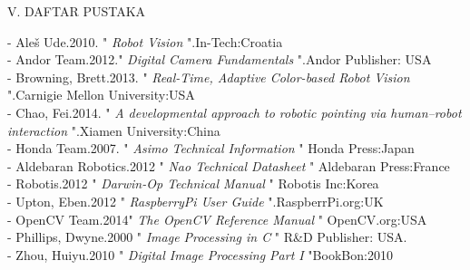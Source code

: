 \documentclass[10pt,journal,compsoc]{IEEEtran}
\begin{document}
  \begin{center}
     V. DAFTAR PUSTAKA
  \end{center}
  
  \noindent - Aleš Ude.2010. " \textit{Robot Vision} ".In-Tech:Croatia\\
  - Andor Team.2012." \textit{Digital Camera Fundamentals} ".Andor Publisher: USA \\
  - Browning, Brett.2013. " \textit{Real-Time, Adaptive Color-based Robot Vision} ".Carnigie Mellon University:USA \\
  - Chao, Fei.2014. " \textit{A developmental approach to robotic pointing via human–robot interaction} ".Xiamen University:China \\
  - Honda Team.2007. " \textit{Asimo Technical Information} " Honda Press:Japan\\
  - Aldebaran Robotics.2012 " \textit{Nao Technical Datasheet} " Aldebaran Press:France\\
  - Robotis.2012 " \textit{Darwin-Op Technical Manual} " Robotis Inc:Korea\\
  - Upton, Eben.2012 " \textit{RaspberryPi User Guide} ".RaspberrPi.org:UK\\
  - OpenCV Team.2014" \textit{The OpenCV Reference Manual} " OpenCV.org:USA\\
  - Phillips, Dwyne.2000 " \textit{Image Processing in C} " R\&D Publisher: USA.\\
  - Zhou, Huiyu.2010 " \textit{Digital Image Processing Part I} "BookBon:2010 \\
\end{document}
